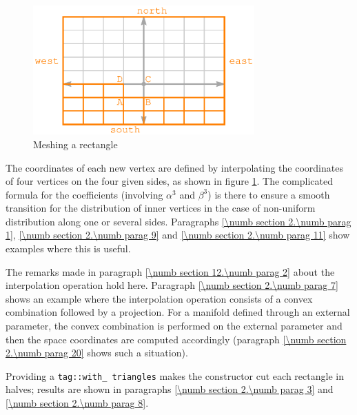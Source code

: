\begin{figure}[ht] \centering
  \includegraphics[width=85mm]{fig-rectangle}
  \caption{Meshing a rectangle}
  \label{\numb section 12.\numb fig 1}
\end{figure}

The coordinates of each new vertex are defined by interpolating the coordinates of four vertices
on the four given sides, as shown in figure \ref{\numb section 12.\numb fig 1}.
The complicated formula for the coefficients (involving $ \alpha^3 $ and $ \beta^3 $) is there
to ensure a smooth transition for the distribution of inner vertices in the case of non-uniform
distribution along one or several sides.
Paragraphs \ref{\numb section 2.\numb parag 1}, \ref{\numb section 2.\numb parag 9} and
\ref{\numb section 2.\numb parag 11} show examples where this is useful.

The remarks made in paragraph \ref{\numb section 12.\numb parag 2} about
the interpolation operation hold here.
Paragraph \ref{\numb section 2.\numb parag 7} shows an example where the interpolation operation
consists of a convex combination followed by a projection.
For a manifold defined through an external parameter, the convex combination is performed
on the external parameter and then the space coordinates are computed accordingly
(paragraph \ref{\numb section 2.\numb parag 20} shows such a situation).

Providing a {\small\tt \textcolor{tag}{tag}::with\_\,triangles} makes the constructor cut each rectangle
in halves; results are shown in paragraphs \ref{\numb section 2.\numb parag 3} and
\ref{\numb section 2.\numb parag 8}.



